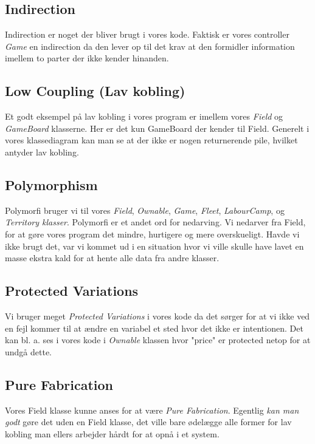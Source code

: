 \subsection{Indirection}
Indirection er noget der bliver brugt i vores kode. Faktisk er vores controller \textit{Game} en indirection da den lever op til det krav at den formidler information imellem to parter der ikke kender hinanden.
\\
\subsection{Low Coupling (Lav kobling)}
Et godt eksempel på lav kobling i vores program er imellem vores \textit{Field} og \textit{GameBoard} klasserne. Her er det kun GameBoard der kender til Field. Generelt i vores klassediagram kan man se at der ikke er nogen returnerende pile, hvilket antyder lav kobling.

\subsection{Polymorphism}
Polymorfi bruger vi til vores \textit{Field}, \textit{Ownable}, \textit{Game}, \textit{Fleet}, \textit{LabourCamp}, og \textit{Territory klasser}. Polymorfi er et andet ord for nedarving. Vi nedarver fra Field, for at gøre vores program det mindre, hurtigere og mere overskueligt. Havde vi ikke brugt det, var vi kommet ud i en situation hvor vi ville skulle have lavet en masse ekstra kald for at hente alle data fra andre klasser.

\subsection{Protected Variations}
Vi bruger meget \textit{Protected Variations} i vores kode da det sørger for at vi ikke ved en fejl kommer til at ændre en variabel et sted hvor det ikke er intentionen. Det kan bl. a. ses i vores kode i \textit{Ownable} klassen hvor "price" er protected netop for at undgå dette. 

\subsection{Pure Fabrication}
Vores Field klasse kunne anses for at være \textit{Pure Fabrication}. Egentlig \textit{kan man godt} gøre det uden en Field klasse, det ville bare ødelægge alle former for lav kobling man ellers arbejder hårdt for at opnå i et system.
